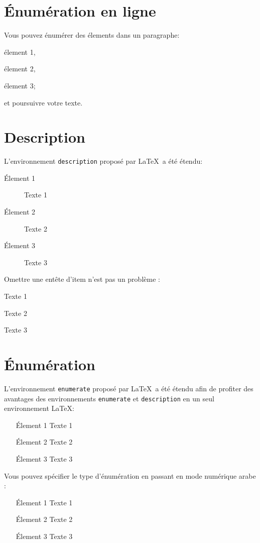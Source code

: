 \documentclass[french]{spimutbmphdthesis}
\begin{document}
\section{\'Enumération en ligne}

Vous pouvez énumérer des élements dans un paragraphe: \begin{inlineenumeration}
\item élement 1,
\item élement 2,
\item élement 3;
\end{inlineenumeration} et poursuivre votre texte.

\section{Description}

L'environnement \texttt{description} proposé par \LaTeX\ a été étendu:
\begin{description}
\item[\'Element 1] Texte 1
\item[\'Element 2] Texte 2
\item[\'Element 3] Texte 3
\end{description}

Omettre une entête d'item n'est pas un problème :
\begin{description}
\item[\'Element 1] Texte 1
\item Texte 2
\item[\'Element 3] Texte 3
\end{description}

\section{\'Enumération}

L'environnement \texttt{enumerate} proposé par \LaTeX\ a été étendu afin de profiter des avantages des environnements \texttt{enumerate} et \texttt{description} en un seul environnement \LaTeX:
\begin{enumerate}
\item[\'Element 1] Texte 1
\item[\'Element 2] Texte 2
\item[\'Element 3] Texte 3
\end{enumerate}

Vous pouvez spécifier le type d'énumération en passant en mode numérique arabe :
\begin{enumerate}[1]
\item[\'Element 1] Texte 1
\item[\'Element 2] Texte 2
\item[\'Element 3] Texte 3
\end{enumerate}
\end{document}
